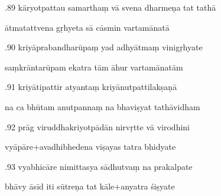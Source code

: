 \documentclass[article,12pt,a4paper]{memoir}%
\newcounter{parCount}
\begin{document}
	  
	  \pstart {}.89 kāryotpattau samarthaṃ vā svena dharmeṇa tat tathā 
	{}
	\pend%
      

	  
	  \pstart \leavevmode%
	ātmatattvena gṛhyeta sā cāsmin vartamānatā 
	{}
	\pend%
      

	  
	  \pstart {}.90 kriyāprabandharūpaṃ yad adhyātmaṃ vinigṛhyate 
	{}
	\pend%
      

	  
	  \pstart \leavevmode%
	saṃkrāntarūpam ekatra tām āhur vartamānatām 
	{}
	\pend%
      

	  
	  \pstart {}.91 kriyātipattir atyantaṃ kriyānutpattilakṣaṇā 
	{}
	\pend%
      

	  
	  \pstart \leavevmode%
	na ca bhūtam anutpannaṃ na bhaviṣyat tathāvidham 
	{}
	\pend%
      

	  
	  \pstart {}.92 prāg viruddhakriyotpādān nirvṛtte vā virodhini 
	{}
	\pend%
      

	  
	  \pstart \leavevmode%
	vyāpāre+avadhibhedena viṣayas tatra bhidyate 
	{}
	\pend%
      

	  
	  \pstart {}.93 vyabhicāre nimittasya sādhutvaṃ na prakalpate 
	{}
	\pend%
      

	  
	  \pstart \leavevmode%
	bhāvy āsīd iti sūtreṇa tat kāle+anyatra śiṣyate 
	{}
	\pend%
      
\end{document}
